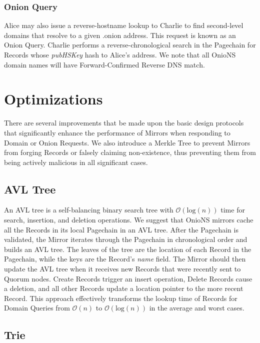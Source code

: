 \subsubsection{Onion Query}

Alice may also issue a reverse-hostname lookup to Charlie to find second-level domains that resolve to a given .onion address. This request is known as an Onion Query. Charlie performs a reverse-chronological search in the Pagechain for Records whose \emph{pubHSKey} hash to Alice's address. We note that all OnioNS domain names will have Forward-Confirmed Reverse DNS match.

\section{Optimizations}
\label{sec:optimizations}

There are several improvements that be made upon the basic design protocols that significantly enhance the performance of Mirrors when responding to Domain or Onion Requests. We also introduce a Merkle Tree to prevent Mirrors from forging Records or falsely claiming non-existence, thus preventing them from being actively malicious in all significant cases.

\subsection{AVL Tree}

An AVL tree is a self-balancing binary search tree with $ \mathcal{O}(\mathrm{log}(n)) $ time for search, insertion, and deletion operations. We suggest that OnioNS mirrors cache all the Records in its local Pagechain in an AVL tree. After the Pagechain is validated, the Mirror iterates through the Pagechain in chronological order and builds an AVL tree. The leaves of the tree are the location of each Record in the Pagechain, while the keys are the Record's \emph{name} field. The Mirror should then update the AVL tree when it receives new Records that were recently sent to Quorum nodes. Create Records trigger an insert operation, Delete Records cause a deletion, and all other Records update a location pointer to the more recent Record. This approach effectively transforms the lookup time of Records for Domain Queries from $ \mathcal{O}(n) $ to $ \mathcal{O}(\mathrm{log}(n)) $ in the average and worst cases.

\subsection{Trie}

